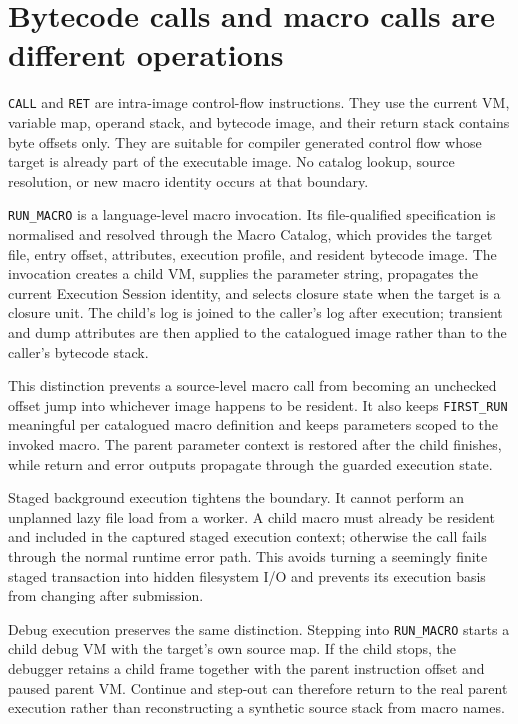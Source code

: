 \documentclass[a4paper,10pt,twoside,openany]{book}
\begin{document}
\section{Bytecode calls and macro calls are different operations}

\texttt{CALL} and \texttt{RET} are intra-image control-flow instructions.
They use the current VM, variable map, operand stack, and bytecode image, and
their return stack contains byte offsets only. They are suitable for compiler
generated control flow whose target is already part of the executable image.
No catalog lookup, source resolution, or new macro identity occurs at that
boundary.

\texttt{RUN\_MACRO} is a language-level macro invocation. Its file-qualified
specification is normalised and resolved through the Macro Catalog, which
provides the target file, entry offset, attributes, execution profile, and
resident bytecode image. The invocation creates a child VM, supplies the
parameter string, propagates the current Execution Session identity, and
selects closure state when the target is a closure unit. The child's log is
joined to the caller's log after execution; transient and dump attributes are
then applied to the catalogued image rather than to the caller's bytecode
stack.

This distinction prevents a source-level macro call from becoming an
unchecked offset jump into whichever image happens to be resident. It also
keeps \texttt{FIRST\_RUN} meaningful per catalogued macro definition and keeps
parameters scoped to the invoked macro. The parent parameter context is
restored after the child finishes, while return and error outputs propagate
through the guarded execution state.

Staged background execution tightens the boundary. It cannot perform an
unplanned lazy file load from a worker. A child macro must already be resident
and included in the captured staged execution context; otherwise the call
fails through the normal runtime error path. This avoids turning a seemingly
finite staged transaction into hidden filesystem I/O and prevents its
execution basis from changing after submission.

Debug execution preserves the same distinction. Stepping into
\texttt{RUN\_MACRO} starts a child debug VM with the target's own source map.
If the child stops, the debugger retains a child frame together with the
parent instruction offset and paused parent VM. Continue and step-out can
therefore return to the real parent execution rather than reconstructing a
synthetic source stack from macro names.
\end{document}
